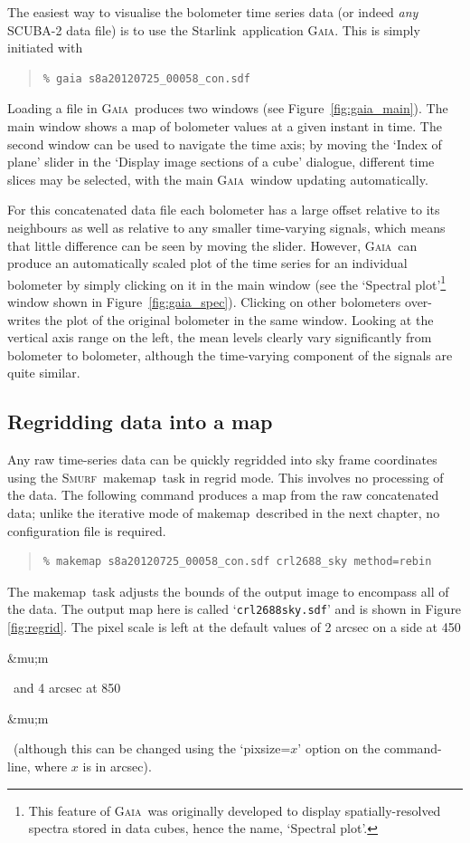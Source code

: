 \documentclass[twoside,11pt]{article}
\newcommand{\micron}{\mbox{\,${\umu}$m}}            %
\newcounter{box}
\newcommand{\htmladdnormallink}[2]{#1}
\newcommand{\xref}[3]{#1}
\newcommand{\xlabel}[1]{}
\renewcommand{\_}{\texttt{\symbol{95}}}
\newenvironment{myquote}{\begin{quote}\begin{small}}{\end{small}\end{quote}}
\newcommand{\starlink}{\htmladdnormallink{Starlink}{http://starlink.jach.hawaii.edu}}
\newcommand{\gaia}{\xref{\textsc{Gaia}}{sun214}{}}
\newcommand{\smurf}{\xref{\textsc{Smurf}}{sun258}{}}
\newcommand{\task}[1]{\textsf{#1}}
\newcommand{\makemap}{\xref{\task{makemap}}{sun258}{MAKEMAP}}
\renewcommand{\micron}{\begin{rawhtml}&mu;m\end{rawhtml}}
\begin{document}
The easiest way to visualise the bolometer time series data (or indeed \emph{any} SCUBA-2 data file) is to use the \starlink\ application \gaia. This is simply initiated with

\begin{myquote}
\begin{verbatim}
% gaia s8a20120725_00058_con.sdf
\end{verbatim}
\end{myquote}

Loading a file in \gaia\ produces two windows (see Figure~\ref{fig:gaia_main}). The main window shows a map of bolometer values at a given instant in time. The second window can be used to navigate the time axis; by moving the `Index of plane' slider in the `Display image sections of a cube' dialogue, different time slices may be selected, with the main \gaia\ window updating automatically.

For this concatenated data file each bolometer has a large offset relative to its neighbours as well as relative to any smaller time-varying signals, which means that little difference can be seen by moving the slider. However, \gaia\ can produce an automatically scaled plot of the time series for an individual bolometer by simply clicking on it in the main window (see the `Spectral plot'\footnote{This feature  of \gaia\ was originally developed to display spatially-resolved  spectra stored in data cubes, hence the name, `Spectral plot'.}
window shown in  Figure~\ref{fig:gaia_spec}). Clicking on other bolometers over-writes the plot of the original bolometer in the same window. Looking at the vertical axis range on the left, the mean levels clearly vary significantly from bolometer to bolometer, although the time-varying component of the signals are quite similar.

\clearpage
\subsection{\xlabel{regrid_map}Regridding data into a map}
\label{sec:regrid}

Any raw time-series data  can be quickly regridded into sky frame coordinates using the \smurf\ \makemap\ task in regrid mode. This involves no processing of the data. The following command produces a map from the raw concatenated data; unlike the iterative mode of \makemap\ described in the next chapter, no configuration file is required.
\begin{myquote}
\begin{verbatim}
% makemap s8a20120725_00058_con.sdf crl2688_sky method=rebin
\end{verbatim}
\end{myquote}
The \makemap\ task adjusts the bounds of the output image to encompass all of the data. The output map here is called `\texttt{crl2688\_sky.sdf}' and is shown in Figure \ref{fig:regrid}. The pixel scale is left at the default values of 2 arcsec on a side at 450\micron\ and 4 arcsec at 850\micron\ (although this can be changed using the `pixsize=$x$' option on the command-line, where $x$ is in arcsec). 
\end{document}
